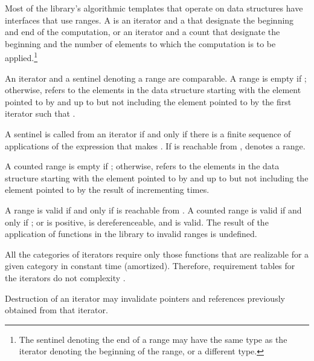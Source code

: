 \begin{addedblock}
\pnum
Most of the library's algorithmic templates that operate on data structures have
interfaces that use ranges. A  is an iterator and a 
that designate the beginning and end of the computation, or an iterator and a
count that designate the beginning and the number of elements to which the
computation is to be applied.\footnote{The sentinel denoting the end of a range
may have the same type as the iterator denoting the beginning of the range, or a
different type.}

\pnum
An iterator and a sentinel denoting a range are comparable. 
A range 
is empty if ;
otherwise, 
refers to the elements in the data structure starting with the element
pointed to by
and up to but not including the element pointed to by
the first iterator  such that .

\pnum
A sentinel  is called  from an iterator  if
and only if there is a finite sequence of applications of the expression
 that makes . If  is reachable from ,
 denotes a range.

\pnum
A counted range  is empty if ; otherwise, 
refers to the  elements in the data structure starting with the element
pointed to by  and up to but not including the element pointed to by
the result of incrementing   times.

\pnum
A range  is valid if and only if  is reachable from
. A counted range  is valid if and only if ;
or  is positive,  is dereferenceable, and 
is valid. The result of the application of functions in the library to invalid
ranges is undefined.
\end{addedblock}

\pnum
All the categories of iterators require only those functions that are realizable for a given category in
constant time (amortized).
Therefore, requirement tables  for the iterators do not   complexity .

\pnum
Destruction of an iterator  may invalidate pointers and references
previously obtained from that iterator.

